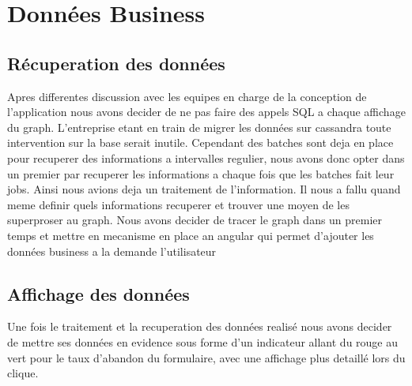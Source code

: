 \section{Données Business}

\subsection{Récuperation des données}
Apres differentes discussion avec les equipes en charge de la conception de l’application nous avons decider de ne pas faire des appels SQL a chaque affichage du graph. L’entreprise etant en train de migrer les données sur cassandra toute intervention sur la base serait inutile.
Cependant des batches sont deja en place pour recuperer des informations a intervalles regulier, nous avons donc opter dans un premier par recuperer les informations a chaque fois que les batches fait leur jobs. Ainsi nous avions deja un traitement de l’information. Il nous a fallu quand meme definir quels informations recuperer et trouver une moyen de les superproser au graph. Nous avons decider de tracer le graph dans un premier temps et mettre en mecanisme en place an angular qui permet d’ajouter les données business a la demande l’utilisateur

\subsection{Affichage des données}
Une fois le traitement et la recuperation des données realisé nous avons decider de mettre ses données en evidence sous forme d'un indicateur allant du rouge au vert pour le taux d’abandon du formulaire, avec une affichage plus detaillé lors du clique. 